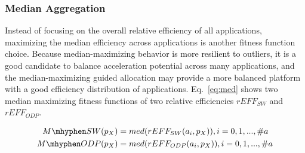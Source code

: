 \subsubsection{Median Aggregation}

Instead of focusing on the overall relative efficiency of all applications, maximizing the median efficiency across applications is another fitness function choice. 
Because median-maximizing behavior is more resilient to outliers, it is a good candidate to balance acceleration potential across many applications, and the median-maximizing guided allocation may provide a more balanced platform with a good efficiency distribution of applications. 
Eq.~\eqref{eq:med} shows two median maximizing fitness functions of two relative efficiencies $rEFF_{SW}$ and $rEFF_{ODP}$. 

\vspace{-4pt}
\begin{equation}
\begin{split}
	M\mhyphen SW (p_{X}) &= med(rEFF_{SW}(a_{i}, p_{X})),   i = 0,1,...,\#a \\
	M\mhyphen ODP (p_{X}) &= med(rEFF_{ODP}(a_{i}, p_{X})), i = 0,1,...,\#a
\label{eq:med}
\end{split}
\end{equation}